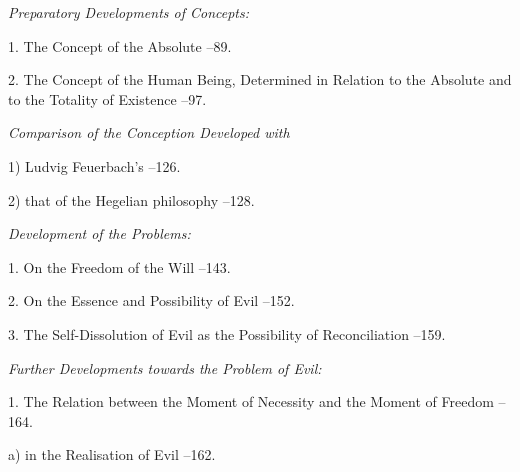 \documentclass[12pt,a4paper]{book}
\begin{document}
\begin{list}{}{%
  \setlength{\leftmargin}{2.2em}\setlength{\itemindent}{-2.2em}%
  \setlength{\itemsep}{2pt}\setlength{\parsep}{0pt}}
\item[] \hspace{1.2em} \emph{Preparatory Developments of Concepts:}
\item[] \hspace{1.2em} 1. The Concept of the Absolute --89.
\item[] \hspace{1.2em} 2. The Concept of the Human Being, Determined in
  Relation to the Absolute and to the Totality of Existence --97.
\item[] \hspace{1.2em} \emph{Comparison of the Conception Developed with}
\item[] \hspace{1.2em} 1) Ludvig Feuerbach's --126.
\item[] \hspace{1.2em} 2) that of the Hegelian philosophy --128.
\item[] \hspace{1.2em} \emph{Development of the Problems:}
\item[] \hspace{1.2em} 1. On the Freedom of the Will --143.
\item[] \hspace{1.2em} 2. On the Essence and Possibility of Evil --152.
\item[] \hspace{1.2em} 3. The Self-Dissolution of Evil as the Possibility
  of Reconciliation --159.
\item[] \hspace{1.2em} \emph{Further Developments towards the Problem of Evil:}
\item[] \hspace{1.2em} 1. The Relation between the Moment of Necessity and
  the Moment of Freedom --164.
\item[] \hspace{2.4em} a) in the Realisation of Evil --162.

\end{list}
\end{document}
